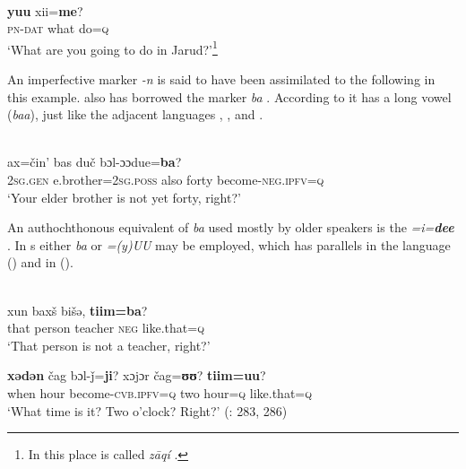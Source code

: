 \ea%
    \label{ex:mong:28}
     \\
     \textbf{{yuu}} {xii=}\textbf{{me}}?\\
    \textsc{pn-dat}    what  do\textsc{=q}\\
    \glt ‘What are you going to do in Jarud?’\footnote{In  this place is called \textit{z\=aqí} .} \citep[15]{Brosig2014}
    \z

An imperfective marker \textit{-n} is said to have been assimilated to the following  in this example.  also has borrowed the  marker \textit{ba} . According to \citet[72]{Chaganhada1991} it has a long vowel (\textit{baa}), just like the adjacent languages , , and .

\ea%
    \label{ex:mong:29}
     \\
     {ax=čin'} {bas} {duč} {bɔl-ɔɔdue=}\textbf{{ba}}?\\
    2\textsc{sg.gen}  e.brother=2\textsc{sg.poss}  also  forty  become-\textsc{neg.ipfv}=\textsc{q}\\
    \glt ‘Your elder brother is not yet forty, right?’ \citep[287]{Yamakoshi2015}
    \z

An authochthonous equivalent of  \textit{ba}  used mostly by older speakers is the  \textit{=i=}\textbf{\textit{dee}} \citep[16]{Brosig2014}. In s either \textit{ba} or \textit{=(y)UU} may be employed, which has parallels in the  language  () and in  ().

\ea%
    \label{ex:mong:30}
     \\
    \ea
     {xun} {baxš} bišə, \textbf{{tiim=ba}}?\\
    that  person  teacher    \textsc{neg}  like.that=\textsc{q}\\
    \glt ‘That person is not a teacher, right?’
    
    \ex
    \gll \textbf{{xədən}} {čag} {bɔl-ǰ=}\textbf{{ji}}?    xɔjɔr {čag=}\textbf{{ʊʊ}}? \textbf{{tiim=uu}}?\\
    when  hour  become-\textsc{cvb.}\textsc{ipfv}=\textsc{q}  two  hour=\textsc{q}    like.that=\textsc{q}\\
    \glt ‘What time is it? Two o’clock? Right?’ (\citealt{Yamakoshi2015}: 283, 286)
    \z
    \z

